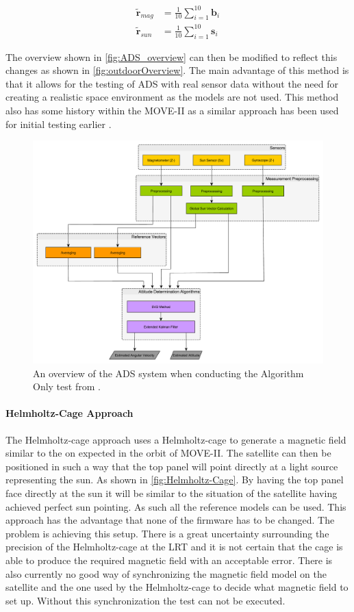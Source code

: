 \begin{subequations}\label{eq:avrgLabFrame}
\begin{align}
	\tilde{\boldsymbol{r}}_{mag} &= \frac{1}{10}\sum\limits_{i=1}^{10}\boldsymbol{b}_i \\
	\tilde{\boldsymbol{r}}_{sun} &= \frac{1}{10}\sum\limits_{i=1}^{10}\boldsymbol{s}_i 
\end{align}	
\end{subequations}  

The overview shown in \autoref{fig:ADS_overview} can then be modified to reflect this changes as shown in \autoref{fig:outdoorOverview}. The main advantage of this method is that it allows for the testing of ADS with real sensor data without the need for creating a realistic space environment as the models are not used. This method also has some history within the MOVE-II as a similar approach has been used for initial testing earlier \cite{DavidThesis}. 

\begin{figure}[tbp]
	\centering
	\includegraphics[width=0.7\columnwidth]{./Pictures/ATTDET_Architecture_Ao}
	\caption{An overview of the ADS system when conducting the Algorithm Only test from \cite{DavidThesis}.}
	\label{fig:outdoorOverview}
\end{figure} 

\paragraph{Helmholtz-Cage Approach}
The Helmholtz-cage approach uses a Helmholtz-cage to generate a magnetic field similar to the on expected in the orbit of MOVE-II. The satellite can then be positioned in such a way that the top panel will point directly at a light source representing the sun. As shown in \autoref{fig:Helmholtz-Cage}. By having the top panel face directly at the sun it will be similar to the situation of the satellite having achieved perfect sun pointing. As such all the reference models can be used. This approach has the advantage that none of the firmware has to be changed. The problem is achieving this setup. There is a great uncertainty surrounding the precision of the Helmholtz-cage at the LRT and it is not certain that the cage is able to produce the required magnetic field with an acceptable error. There is also currently no good way of synchronizing the magnetic field model on the satellite and the one used by the Helmholtz-cage to decide what magnetic field to set up. Without this synchronization the test can not be executed. 

